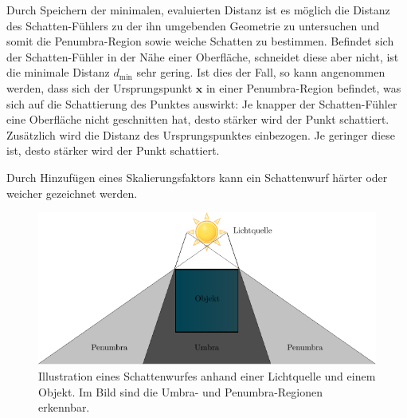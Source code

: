 Durch Speichern der minimalen, evaluierten Distanz ist es möglich die
Distanz des Schatten-Fühlers zu der ihn umgebenden Geometrie zu
untersuchen und somit die Penumbra-Region sowie weiche Schatten zu
bestimmen. Befindet sich der Schatten-Fühler in der Nähe einer
Oberfläche, schneidet diese aber nicht, ist die minimale Distanz
$d_{\text{min}}$ sehr gering. Ist dies der Fall, so kann angenommen
werden, dass sich der Ursprungspunkt $\bm{x}$ in einer Penumbra-Region
befindet, was sich auf die Schattierung des Punktes auswirkt: Je
knapper der Schatten-Fühler eine Oberfläche nicht geschnitten hat, desto
stärker wird der Punkt schattiert. Zusätzlich wird die Distanz des
Ursprungspunktes einbezogen. Je geringer diese ist, desto stärker wird
der Punkt schattiert.

Durch Hinzufügen eines Skalierungsfaktors kann ein Schattenwurf härter
oder weicher gezeichnet werden.

\begin{figure}[H]
    \centering
    \includegraphics{img/shadowing.pdf}
    \caption{Illustration eines Schattenwurfes anhand einer Lichtquelle
        und einem Objekt. Im Bild sind die Umbra- und Penumbra-Regionen
        erkennbar.\protect\footnotemark}\label{fig:shadowing}
\end{figure}

